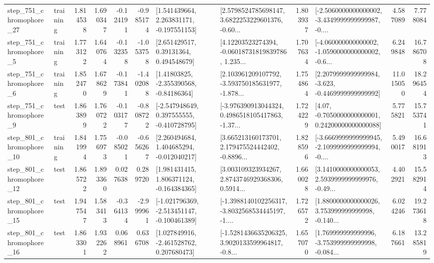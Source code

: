 \begin{tabular}{llrrrrllrlrr}
  step\_751\_chromophore\_27 &  training &      1.814538 &    1.690347 &     -0.124191 & -0.985174 &    [1.541439664, 2.263831171, -0.197551153] &  [2.5798524785698147, 3.6822253229601376, -0.60... &       1.803937 &  [-2.5060000000000002, -3.4349999999999987, -0.... &            4.587089 &          7.778084 \\
   step\_751\_chromophore\_5 &  training &      1.773122 &    1.640764 &     -0.132358 & -1.053758 &      [2.651429517, 0.39131364, 0.494548679] &  [4.12203523274394, -0.06018731819839786, 1.235... &       1.707634 &  [-4.060000000000002, -1.0590000000000002, -0.6... &            6.249848 &         16.786708 \\
   step\_751\_chromophore\_6 &  training &      1.852470 &    1.678629 &     -0.173841 & -1.402088 &     [1.41803825, -2.355390568, -0.84186364] &  [2.103961209107792, -3.593750185631977, -1.878... &       1.754864 &  [2.2079999999999984, -3.623, -0.4469999999999992] &           11.015050 &         18.296454 \\
   step\_751\_chromophore\_9 &      test &      1.863899 &    1.760722 &     -0.103177 & -0.808722 &   [-2.547948649, 0.397555555, -0.410728795] &  [-3.976390913044324, 0.4986518105417863, -1.37... &       1.724229 &   [4.07, -0.7050000000000001, 0.24200000000000088] &            5.775821 &         15.753741 \\
  step\_801\_chromophore\_10 &  training &      1.841994 &    1.756973 &     -0.085021 & -0.656267 &    [2.260494684, 1.404685294, -0.012040217] &  [3.665213160173701, 2.179475524442402, -0.8896... &       1.828596 &  [-3.6669999999999945, -2.1099999999999994, -0.... &            5.490017 &         16.681913 \\
  step\_801\_chromophore\_12 &      test &      1.865722 &    1.893360 &      0.027638 &  0.289720 &    [1.981431415, 1.806371124, -0.164384365] &  [3.003109323934267, 2.8743746929368306, 0.5914... &       1.660028 &  [3.1410000000000053, 2.5939999999999976, -0.49... &            4.402921 &         15.582914 \\
  step\_801\_chromophore\_15 &      test &      1.947547 &    1.583413 &     -0.364134 & -2.999961 &  [-1.021796369, -2.513451147, -0.100461389] &  [-1.3988140102256317, -3.8032568534445197, -1.... &       1.726572 &  [1.8800000000000026, 3.753999999999998, -0.140... &            6.024246 &         19.273618 \\
  step\_801\_chromophore\_16 &      test &      1.863301 &    1.932262 &      0.068961 &  0.636708 &    [1.027849916, -2.461528762, 0.207680473] &  [-1.5281436635206325, 3.9020133599964817, -0.8... &       1.657070 &  [1.769999999999996, -3.753999999999998, -0.084... &            6.187661 &         13.285819 \\

\end{tabular}
